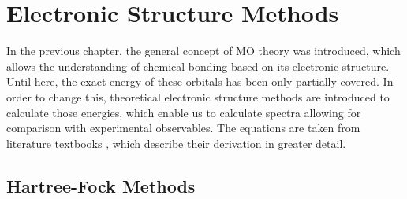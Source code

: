 \chapter{Electronic Structure Methods}
\label{chapter:Electronic_Structure_Methods}
In the previous chapter, the general concept of MO theory was introduced, which allows the understanding of chemical bonding based on its electronic structure. Until here, the exact energy of these orbitals has been only partially covered. In order to change this, theoretical electronic structure methods are introduced to calculate those energies, which enable us to calculate spectra allowing for comparison with experimental observables. The equations are taken from literature textbooks \cite{szabo1996modern, jensen2017introduction}, which describe their derivation in greater detail.

\section{Hartree-Fock Methods}
